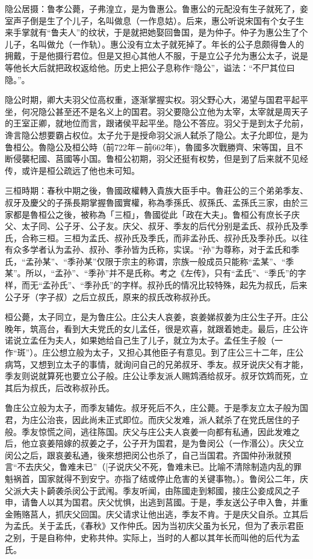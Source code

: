隐公居摄：鲁孝公薨，子弗湟立，是为鲁惠公。鲁惠公的元配没有生子就死了，妾室声子倒是生了个儿子，名叫做息（一作息姑）。后来，惠公听说宋国有个女子生来手掌就有“鲁夫人”的纹状，于是就把她娶回鲁国，是为仲子。仲子为惠公生了个儿子，名叫做允（一作轨）。惠公没有立太子就死掉了。年长的公子息颇得鲁人的拥戴，于是他摄行君位。但是又担心其他人不服，于是立公子允为惠公太子，说是等他长大后就把政权返给他。历史上把公子息称作“隐公”，谥法：“不尸其位曰隐。”。

隐公时期，卿大夫羽父位高权重，逐渐掌握实权。羽父野心大，渴望与国君平起平坐，何况隐公甚至还不是名义上的国君。羽父要隐公立他为太宰，太宰就是周天子的王室正卿，就地位而言，跟诸侯平起平坐。隐公不答应。羽父于是到太子允前，谗言隐公想要霸占权位。太子允于是授命羽父派人弑杀了隐公。太子允即位，是为鲁桓公。魯隐公及桓公時（前722年－前662年)，魯國多次戰勝齊、宋等国，且不断侵襲杞國、莒國等小国。鲁桓公初期，羽父还挺有权势，但是到了后来就不见经传，或许是桓公疏远了他也未可知。

三桓時期：春秋中期之後，魯國政權轉入貴族大臣手中。魯莊公的三个弟弟季友、叔牙及慶父的子孫長期掌握魯國實權，称為季孫氏、叔孫氏、孟孫氏三家，由於三家都是魯桓公之後，被称為「三桓」，魯國從此「政在大夫」。鲁桓公有庶长子庆父、太子同、公子牙、公子友。庆父、叔牙、季友的后代分别是孟氏、叔孙氏及季氏，合称三桓。三桓为孟氏、叔孙氏及季氏，而非孟孙氏、叔孙氏及季孙氏。以往有众多学者认为孟孙、叔孙、季孙皆为氏称，实误。“孙”为尊称，对于孟氏和季氏，“孟孙某”、“季孙某”仅限于宗主的称谓，宗族一般成员只能称“孟某”、“季某”。所以，“孟孙”、“季孙”并不是氏称。考之《左传》，只有“孟氏”、“季氏”的字样，而无“孟孙氏”、“季孙氏”的字样。叔孙氏的情况比较特殊，起先为叔氏，后来公子牙（字子叔）之后立叔氏，原来的叔氏改称叔孙氏。

桓公薨，太子同立，是为鲁庄公。庄公夫人哀姜，哀姜娣叔姜为庄公生子开。庄公晚年，筑高台，看到大夫党氏的女儿孟任，很是欢喜，就跟着她走。最后，庄公许诺说立孟任为夫人，如果她给自己生了儿子，就立为太子。孟任生子般（一作“斑”）。庄公想立般为太子，又担心其他臣子有意见。到了庄公三十二年，庄公病笃，又想到立太子的事情，就询问自己的兄弟叔牙、季友。叔牙说庆父有才能，季友则说就算死也要立公子般。庄公让季友派人赐鸩酒给叔牙。叔牙饮鸩而死，立其后为叔氏，后改称叔孙氏。

鲁庄公立般为太子，而季友辅佐。叔牙死后不久，庄公薨。于是季友立太子般为国君，为庄公治丧，因此尚未正式即位。而庆父发难，派人弑杀了在党氏居住的子般。季友惊慌之间，逃往陈国。庆父与庄公夫人哀姜一向都有私通，因此发难之后，他立哀姜陪嫁的叔姜之子，公子开为国君，是为鲁闵公（一作湣公）。庆父立闵公之后，跟哀姜私通，後來想把闵公也杀了，自己当国君。齐国仲孙湫就预言“不去庆父，鲁难未已”（[子说庆父不死，鲁难未已。比喻不清除制造内乱的罪魁祸首，国家就得不到安宁。亦指了结或停止危害的关键事物。）。鲁闵公二年，庆父派大夫卜齮袭杀闵公于武闱。季友听闻，由陈國走到邾國，接庄公妾成风之子申，请鲁人以其为国君。庆父忧惧，出逃到莒國。于是，季友送公子申入鲁，并重金贿赂莒人，抓庆父回国。庆父请求让他出逃，季友不肯。于是庆父自杀。立其后为孟氏。关于孟氏，《春秋》又作仲氏。因为当初庆父虽为长兄，但为了表示君臣之别，于是自称仲，史称共仲。实际上，当时的人都以其年长而叫他的后代为孟氏。

